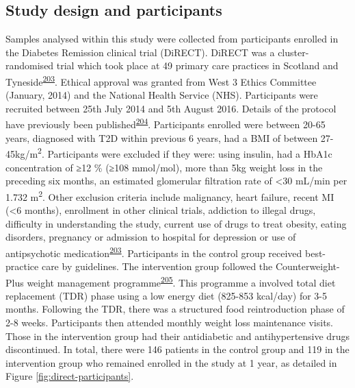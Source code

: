 \documentclass[11pt,twoside]{bristolthesis}
\begin{document}
\hypertarget{study-design-and-participants}{%
\subsection{Study design and participants}\label{study-design-and-participants}}

Samples analysed within this study were collected from participants enrolled in the Diabetes Remission clinical trial (DiRECT). DiRECT was a cluster-randomised trial which took place at 49 primary care practices in Scotland and Tyneside\textsuperscript{\protect\hyperlink{ref-Lean2018}{203}}. Ethical approval was granted from West 3 Ethics Committee (January, 2014) and the National Health Service (NHS). Participants were recruited between 25th July 2014 and 5th August 2016. Details of the protocol have previously been published\textsuperscript{\protect\hyperlink{ref-Leslie2016}{204}}. Participants enrolled were between 20-65 years, diagnosed with T2D within previous 6 years, had a BMI of between 27-45kg/m\textsuperscript{2}. Participants were excluded if they were: using insulin, had a HbA1c concentration of ≥12 \% (≥108 mmol/mol), more than 5kg weight loss in the preceding six months, an estimated glomerular filtration rate of \textless30 mL/min per 1.732 m\textsuperscript{2}. Other exclusion criteria include malignancy, heart failure, recent MI (\textless6 months), enrollment in other clinical trials, addiction to illegal drugs, difficulty in understanding the study, current use of drugs to treat obesity, eating disorders, pregnancy or admission to hospital for depression or use of antipsychotic medication\textsuperscript{\protect\hyperlink{ref-Lean2018}{203}}. Participants in the control group received best-practice care by guidelines. The intervention group followed the Counterweight-Plus weight management programme\textsuperscript{\protect\hyperlink{ref-Lean2013}{205}}. This programme a involved total diet replacement (TDR) phase using a low energy diet (825-853 kcal/day) for 3-5 months. Following the TDR, there was a structured food reintroduction phase of 2-8 weeks. Participants then attended monthly weight loss maintenance visits. Those in the intervention group had their antidiabetic and antihypertensive drugs discontinued. In total, there were 146 patients in the control group and 119 in the intervention group who remained enrolled in the study at 1 year, as detailed in Figure \ref{fig:direct-participants}.
\end{document}
